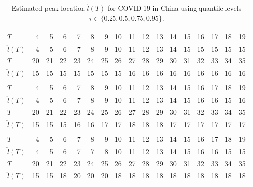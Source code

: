 \documentclass[12pt,a4paper]{article}
\begin{document}
{		\begin{landscape}
			\begin{table}[htbp]
				\caption{Estimated peak location $\hat{l}(T)$ for COVID-19 in China using quantile levels $\tau\in\{0.25,0.5,0.75,0.95\}$.}
				\label{tab:china_tau}
				\begin{tabular*}{\linewidth}{@{\extracolsep{\fill}}lrrrrrrrrrrrrrrrr}
					\toprule
					\addlinespace[2.5pt]
					\multicolumn{17}{c}{\textbf{$\tau=0.25,\ T_{\mathrm{entry}}=13,\ \varepsilon=3$}} \\
					\addlinespace[2.5pt]
					\midrule
					$T$ & 4 & 5 & 6 & 7 & 8 & 9 & 10 & 11 & 12 & 13 & 14 & 15 & 16 & 17 & 18 & 19 \\
					$\hat{l}(T)$ & 4 & 5 & 6 & 7 & 8 & 9 & 10 & 11 & 12 & 13 & 14 & 15 & 15 & 15 & 15 & 15 \\
					$T$ & 20 & 21 & 22 & 23 & 24 & 25 & 26 & 27 & 28 & 29 & 30 & 31 & 32 & 33 & 34 & 35 \\
					$\hat{l}(T)$ & 15 & 15 & 15 & 15 & 15 & 15 & 15 & 16 & 16 & 16 & 16 & 16 & 16 & 16 & 16 & 16 \\
					\midrule\addlinespace[2.5pt]
					\multicolumn{17}{c}{\textbf{$\tau=0.5,\ T_{\mathrm{entry}}=15,\ \varepsilon=3$}} \\
					\addlinespace[2.5pt]
					\midrule
					$T$ & 4 & 5 & 6 & 7 & 8 & 9 & 10 & 11 & 12 & 13 & 14 & 15 & 16 & 17 & 18 & 19 \\
					$\hat{l}(T)$ & 4 & 5 & 6 & 7 & 8 & 9 & 10 & 11 & 12 & 13 & 14 & 15 & 16 & 16 & 15 & 16 \\
					$T$ & 20 & 21 & 22 & 23 & 24 & 25 & 26 & 27 & 28 & 29 & 30 & 31 & 32 & 33 & 34 & 35 \\
					$\hat{l}(T)$ & 15 & 15 & 15 & 16 & 16 & 17 & 17 & 18 & 18 & 18 & 17 & 17 & 17 & 17 & 17 & 17 \\
					\midrule\addlinespace[2.5pt]
					\multicolumn{17}{c}{\textbf{$\tau=0.75,\ T_{\mathrm{entry}}=22,\ \varepsilon=3$}} \\
					\addlinespace[2.5pt]
					\midrule
					$T$ & 4 & 5 & 6 & 7 & 8 & 9 & 10 & 11 & 12 & 13 & 14 & 15 & 16 & 17 & 18 & 19 \\
					$\hat{l}(T)$ & 4 & 5 & 6 & 7 & 7 & 8 & 10 & 11 & 12 & 13 & 14 & 15 & 16 & 16 & 15 & 15 \\
					$T$ & 20 & 21 & 22 & 23 & 24 & 25 & 26 & 27 & 28 & 29 & 30 & 31 & 32 & 33 & 34 & 35 \\
					$\hat{l}(T)$ & 15 & 15 & 18 & 20 & 20 & 20 & 18 & 18 & 18 & 18 & 18 & 18 & 18 & 18 & 18 & 18 \\

\end{tabular*}
\end{table}
\end{landscape}}
\end{document}
